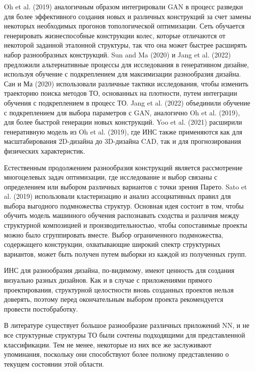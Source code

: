 Oh et al. (2019) аналогичным образом интегрировали GAN в процесс разведки для более эффективного создания новых и различных конструкций за счет замены некоторых необходимых прогонов топологической оптимизации. Сеть обучается генерировать жизнеспособные конструкции колес, которые отличаются от некоторой заданной эталонной структуры, так что она может быстрее расширять набор разнообразных конструкций. Sun and Ma (2020) и Jang et al. (2022) предложили альтернативные процессы для исследования в генеративном дизайне, используя обучение с подкреплением для максимизации разнообразия дизайна. Сан и Ма (2020) использовали различные тактики исследования, чтобы изменить траекторию поиска методов ТО, основанных на плотности, путем интеграции обучения с подкреплением в процесс ТО. Jang et al. (2022) объединили обучение с подкреплением для выбора параметров с GAN, аналогично Oh et al. (2019), для более быстрой генерации новых конструкций. Yoo et al. (2021) расширили генеративную модель из Oh et al. (2019), где ИНС также применяются как для масштабирования 2D-дизайна до 3D-дизайна CAD, так и для прогнозирования физических характеристик.

Естественным продолжением разнообразия конструкций является рассмотрение многоцелевых задач оптимизации, где исследование и выбор связаны с определением или выбором различных вариантов с точки зрения Парето. Sato et al. (2019) использовали кластеризацию и анализ ассоциативных правил для выбора выгодного подмножества структур. Основная идея состоит в том, чтобы обучить модель машинного обучения распознавать сходства и различия между структурной композицией и производительностью, чтобы сопоставимые проекты можно было сгруппировать вместе. Выбор ограниченного подмножества, содержащего конструкции, охватывающие широкий спектр структурных вариантов, может быть получен путем выборки из каждой из полученных групп.

ИНС для разнообразия дизайна, по-видимому, имеют ценность для создания визуально разных дизайнов. Как и в случае с приложениями прямого проектирования, структурной целостности вновь созданных проектов нельзя доверять, поэтому перед окончательным выбором проекта рекомендуется провести постобработку.



В литературе существует большое разнообразие различных приложений NN, и не все структурные структуры ТО были сочтены подходящими для представленной классификации. Тем не менее, некоторые из них все же заслуживают упоминания, поскольку они способствуют более полному представлению о текущем состоянии этой области.


